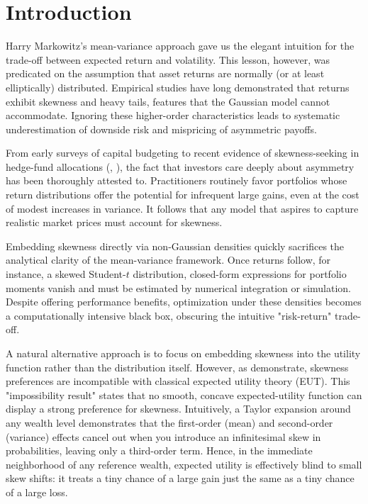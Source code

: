 \chapter{Introduction}
\label{chap:intro}

Harry Markowitz's mean-variance approach gave us the elegant intuition for the trade-off between expected return and volatility. This lesson, however, was predicated on the assumption that asset returns are normally (or at least elliptically) distributed. Empirical studies have long demonstrated that returns exhibit skewness and heavy tails, features that the Gaussian model cannot accommodate. Ignoring these higher-order characteristics leads to systematic underestimation of downside risk and mispricing of asymmetric payoffs.

From early surveys of capital budgeting to recent evidence of skewness-seeking in hedge-fund allocations (\cite{maoSurveyCapitalBudgeting1970}, \cite{benuzziSkewnessseekingBehaviorFinancial2024}), the fact that investors care deeply about asymmetry has been thoroughly attested to. Practitioners routinely favor portfolios whose return distributions offer the potential for infrequent large gains, even at the cost of modest increases in variance. It follows that any model that aspires to capture realistic market prices must account for skewness. 

Embedding skewness directly via non-Gaussian densities quickly sacrifices the analytical clarity of the mean-variance framework. Once returns follow, for instance, a skewed Student-$t$ distribution, closed-form expressions for portfolio moments vanish and must be estimated by numerical integration or simulation. Despite offering performance benefits, optimization under these densities becomes a computationally intensive black box, obscuring the intuitive "risk-return" trade-off.

A natural alternative approach is to focus on embedding skewness into the utility function rather than the distribution itself. However, as \cite{ebertSkewnessPreferencePopularity2016} demonstrate, skewness preferences are incompatible with classical expected utility theory (EUT). This "impossibility result" states that no smooth, concave expected-utility function can display a strong preference for skewness. Intuitively, a Taylor expansion around any wealth level demonstrates that the first-order (mean) and second-order (variance) effects cancel out when you introduce an infinitesimal skew in probabilities, leaving only a third-order term. Hence, in the immediate neighborhood of any reference wealth, expected utility is effectively blind to small skew shifts: it treats a tiny chance of a large gain just the same as a tiny chance of a large loss.

